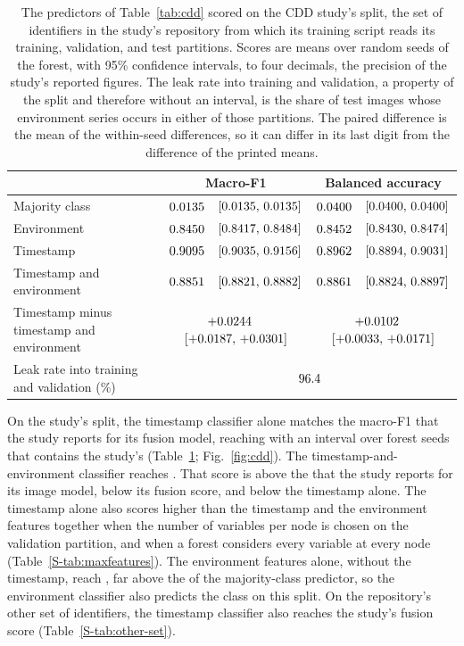 \documentclass[preprint,12pt,authoryear,nopreprintline]{elsarticle}
\begin{document}
\begin{table}[t]
\centering
\footnotesize
\caption{The predictors of Table~\ref{tab:cdd} scored on the CDD study's split, the
set of identifiers in the study's repository from which its training script reads
its training, validation, and test partitions. Scores are means over \cddTheirSeeds{}
random seeds of the forest, with 95\% confidence intervals, to four decimals, the
precision of the study's reported figures. The leak rate into training and validation, a
property of the split and therefore without an interval, is the share of test images
whose environment series occurs in either of those partitions. The paired difference is the mean of the
within-seed differences, so it can differ in its last digit from the difference of the
printed means.}
\label{tab:cdd-theirs}
\begin{tabular}{>{\raggedright\arraybackslash}p{}cc}
\toprule
 & Macro-F1 & Balanced accuracy \\
\midrule
Majority class & $0.0135{}$~~$[0.0135,\,0.0135]{}$ & $0.0400{}$~~$[0.0400,\,0.0400]{}$ \\
Environment & $0.8450{}$~~$[0.8417,\,0.8484]{}$ & $0.8452{}$~~$[0.8430,\,0.8474]{}$ \\
Timestamp & $0.9095{}$~~$[0.9035,\,0.9156]{}$ & $0.8962{}$~~$[0.8894,\,0.9031]{}$ \\
Timestamp and environment & $0.8851{}$~~$[0.8821,\,0.8882]{}$ & $0.8861{}$~~$[0.8824,\,0.8897]{}$ \\
\midrule
Timestamp minus timestamp and environment & $+0.0244{}$~~$[+0.0187,\,+0.0301]{}$ & $+0.0102{}$~~$[+0.0033,\,+0.0171]{}$ \\
\midrule
Leak rate into training and validation (\%) & \multicolumn{2}{c}{$96.4{}$} \\
\bottomrule
\end{tabular}
\end{table}

On the study's split, the timestamp classifier alone matches the macro-F1 that the
study reports for its fusion model, reaching \cddTheirTimestamp{} with an interval over
forest seeds that contains the study's \paperMultiFone{} (Table~\ref{tab:cdd-theirs};
Fig.~\ref{fig:cdd}). The timestamp-and-environment classifier reaches \cddTheirTimestampEnv{}. That score is above the \paperImageFone{} that the study
reports for its image model, below its fusion score, and below the timestamp alone. The timestamp alone also scores higher than the timestamp and the
environment features together when the number of variables per node is chosen on the
validation partition, and when a forest considers every variable at every node
(Table~\ref{S-tab:maxfeatures}). The environment features alone, without
the timestamp, reach \cddTheirEnv{}, far above the \cddTheirBase{} of the
majority-class predictor, so the environment classifier also predicts the class on
this split. On the repository's other set of identifiers, the timestamp
classifier also reaches the study's fusion score (Table~\ref{S-tab:other-set}).
\end{document}
